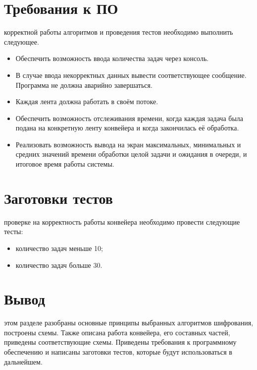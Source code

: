 \section{Требования к ПО}
 корректной работы алгоритмов и проведения тестов необходимо выполнить следующее.
\begin{itemize}
	\item Обеспечить возможность ввода количества задач через консоль.
	\item В случае ввода некорректных данных вывести соответствующее сообщение. Программа не должна аварийно завершаться.
	\item Каждая лента должна работать в своём потоке.
	\item Обеспечить возможность отслеживания времени, когда каждая задача была подана на конкретную ленту конвейера и когда закончилась её обработка.
	\item Реализовать возможность вывода на экран максимальных, минимальных и средних значений времени обработки целой задачи и ожидания в очереди, и итоговое время работы системы.
\end{itemize}

\section{Заготовки тестов}
 проверке на корректность работы конвейера необходимо провести следующие тесты:
\begin{itemize}
	\item количество задач меньше 10;
	\item количество задач больше 30.
\end{itemize}

\section*{Вывод}
 этом разделе разобраны основные принципы выбранных алгоритмов шифрования, построены схемы. Также описана работа конвейера, его составных частей, приведены соответствующие схемы. Приведены требования к программному обеспечению и написаны заготовки тестов, которые будут использоваться в дальнейшем.
